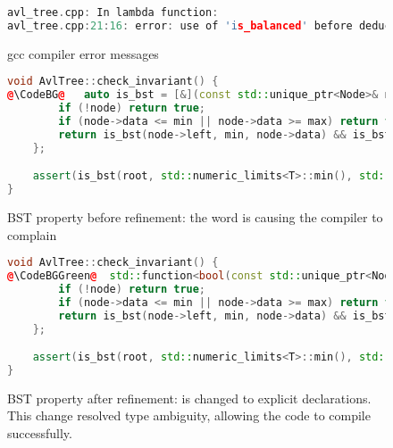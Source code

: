 \begin{figure}[htp]
\centering
\begin{lstlisting}[language=c++, escapechar=@]
avl_tree.cpp: In lambda function:
avl_tree.cpp:21:16: error: use of 'is_balanced' before deduction of 'auto'
\end{lstlisting}
    \caption{gcc compiler error messages}
    \label{fig:gcc_compiler_error}
\end{figure}
\begin{figure}[htp]
\begin{lstlisting}[language=c++, escapechar=@]
void AvlTree::check_invariant() {
@\CodeBG@   auto is_bst = [&](const std::unique_ptr<Node>& node, const T& min, const T& max) -> bool {
        if (!node) return true;
        if (node->data <= min || node->data >= max) return false;
        return is_bst(node->left, min, node->data) && is_bst(node->right, node->data, max);
    };

    assert(is_bst(root, std::numeric_limits<T>::min(), std::numeric_limits<T>::max()));
}
\end{lstlisting}
    \caption{BST property before refinement: the word  is causing the compiler to complain}
    \label{fig:avl_bst_before}
\end{figure}




\begin{figure}[htp]
\centering
\begin{lstlisting}[language=c++, escapechar=@]
void AvlTree::check_invariant() {
@\CodeBGGreen@  std::function<bool(const std::unique_ptr<Node>&)> is_bst = [&](const std::unique_ptr<Node>& node, const T& min, const T& max) -> bool {
        if (!node) return true;
        if (node->data <= min || node->data >= max) return false;
        return is_bst(node->left, min, node->data) && is_bst(node->right, node->data, max);
    };

    assert(is_bst(root, std::numeric_limits<T>::min(), std::numeric_limits<T>::max()));
}
\end{lstlisting}
    \caption{BST property after refinement:  is changed to explicit declarations. This change resolved type ambiguity, allowing the code to compile successfully.}
    \label{fig:avl_bst_after}
\end{figure}



